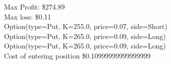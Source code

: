 Max Profit: \$274.89
\\Max loss: \$0.11
\\Option(type=Put, K=255.0, price=0.07, side=Short)
\\Option(type=Put, K=265.0, price=0.09, side=Long)
\\Option(type=Put, K=265.0, price=0.09, side=Long)
\\Cost of entering position \$0.10999999999999999